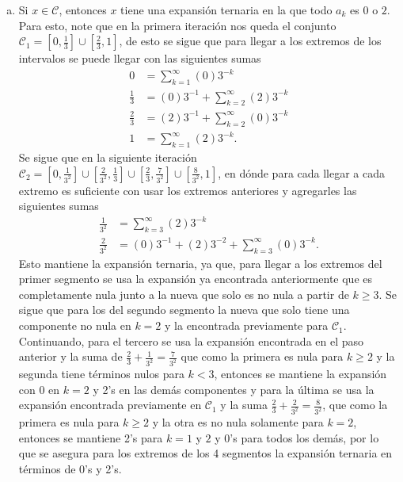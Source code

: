 \begin{solucion}
  \begin{enumerate}[a)]
    \item Si $x\in\mathcal{C}$, entonces $x$ tiene una expansión ternaria en la que todo $a_{k}$ es $0$ o $2$.\\
      Para esto, note que en la primera iteración nos queda el conjunto $\mathcal{C}_{1}=[0,\frac{1}{3}]\cup[\frac{2}{3},1]$, de esto se sigue que para llegar a los extremos de los intervalos se puede llegar con las siguientes sumas
      \begin{align*}
        0&=\sum_{k=1}^{\infty}(0)3^{-k}\\
        \frac{1}{3}&=(0)3^{-1}+\sum_{k=2}^{\infty}(2)3^{-k}\\
        \frac{2}{3}&=(2)3^{-1}+\sum_{k=2}^{\infty}(0)3^{-k}\\
        1&=\sum_{k=1}^{\infty}(2)3^{-k}.
      \end{align*}
      Se sigue que en la siguiente iteración $\mathcal{C}_{2}=[0,\frac{1}{3^{2}}]\cup[\frac{2}{3^{2}},\frac{1}{3}]\cup[\frac{2}{3},\frac{7}{3^{2}}]\cup[\frac{8}{3^{2}},1]$, en dónde para cada llegar a cada extremo es suficiente con usar los extremos anteriores y agregarles las siguientes sumas
      \begin{align*}
        \frac{1}{3^{2}}&=\sum_{k=3}^{\infty}(2)3^{-k}\\
        \frac{2}{3^{2}}&=(0)3^{-1}+(2)3^{-2}+\sum_{k=3}^{\infty}(0)3^{-k}.
      \end{align*}
      Esto mantiene la expansión ternaria, ya que, para llegar a los extremos del primer segmento se usa la expansión ya encontrada anteriormente que es completamente nula junto a la nueva que solo es no nula a partir de $k\geq 3$. Se sigue que para los del segundo segmento la nueva que solo tiene una componente no nula en $k=2$ y la encontrada previamente para $\mathcal{C}_{1}$. Continuando, para el tercero se usa la expansión encontrada en el paso anterior y la suma de $\frac{2}{3}+\frac{1}{3^{2}}=\frac{7}{3^{2}}$ que como la primera es nula para $k\geq 2$ y la segunda tiene términos nulos para $k<3$, entonces se mantiene la expansión con 0 en $k=2$ y 2's en las demás componentes y para la última se usa la expansión encontrada previamente en $\mathcal{C}_{1}$ y la suma $\frac{2}{3}+\frac{2}{3^{2}}=\frac{8}{3^{2}}$, que como la primera es nula para $k\geq 2$ y la otra es no nula solamente para $k=2$, entonces se mantiene 2's para $k=1$ y $2$ y 0's para todos los demás, por lo que se asegura para los extremos de los 4 segmentos la expansión ternaria en términos de 0's y 2's.\\

\end{enumerate}
\end{solucion}
